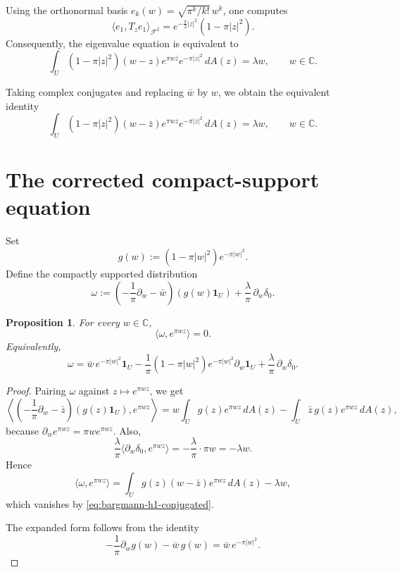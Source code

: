 \documentclass[11pt]{article}
\newtheorem{proposition}[theorem]{Proposition}
\newcommand{\C}{\mathbb C}
\newcommand{\1}{\mathbf 1}
\newcommand{\pw}{\partial_w}
\begin{document}
Using the orthonormal basis \(e_k(w)=\sqrt{\pi^k/k!}\,w^k\), one computes
\[
\langle e_1,T_ze_1\rangle_{\mathcal F^2}
=
e^{-\frac{\pi}{2}|z|^2}(1-\pi|z|^2).
\]
Consequently, the eigenvalue equation is equivalent to
\begin{equation}\label{eq:bargmann-h1}
\int_U (1-\pi|z|^2)(w-z)e^{\pi w\bar z}e^{-\pi|z|^2}\,dA(z)=\lambda w,
\qquad w\in \C.
\end{equation}

Taking complex conjugates and replacing \(\bar w\) by \(w\), we obtain the equivalent identity
\begin{equation}\label{eq:bargmann-h1-conjugated}
\int_U (1-\pi|z|^2)(w-\bar z)e^{\pi wz}e^{-\pi|z|^2}\,dA(z)=\lambda w,
\qquad w\in \C.
\end{equation}

\section{The corrected compact-support equation}

Set
\[
g(w):=(1-\pi|w|^2)e^{-\pi|w|^2}.
\]
Define the compactly supported distribution
\begin{equation}\label{eq:def-omega}
\omega:=
\left(-\frac{1}{\pi}\pw-\bar w\right)\!\left(g(w)\1_U\right)
+\frac{\lambda}{\pi}\,\pw\delta_0.
\end{equation}

\begin{proposition}\label{prop:first-order}
For every \(w\in \C\),
\[
\langle \omega,e^{\pi wz}\rangle = 0.
\]
Equivalently,
\[
\omega
=
\bar w\,e^{-\pi|w|^2}\1_U
-\frac{1}{\pi}(1-\pi|w|^2)e^{-\pi|w|^2}\pw\1_U
+\frac{\lambda}{\pi}\,\pw\delta_0.
\]
\end{proposition}

\begin{proof}
Pairing \(\omega\) against \(z\mapsto e^{\pi wz}\), we get
\[
\left\langle
\left(-\frac{1}{\pi}\pw-\bar z\right)\!\left(g(z)\1_U\right),
e^{\pi wz}
\right\rangle
=
w\int_U g(z)e^{\pi wz}\,dA(z)
-\int_U \bar z\,g(z)e^{\pi wz}\,dA(z),
\]
because \(\pw e^{\pi wz}=\pi w e^{\pi wz}\). Also,
\[
\frac{\lambda}{\pi}\langle \pw\delta_0,e^{\pi wz}\rangle
=
-\frac{\lambda}{\pi}\cdot \pi w
=
-\lambda w.
\]
Hence
\[
\langle \omega,e^{\pi wz}\rangle
=
\int_U g(z)(w-\bar z)e^{\pi wz}\,dA(z)-\lambda w,
\]
which vanishes by \eqref{eq:bargmann-h1-conjugated}.

The expanded form follows from the identity
\[
-\frac{1}{\pi}\pw g(w)-\bar w\,g(w)=\bar w\,e^{-\pi|w|^2}.
\]
\end{proof}
\end{document}
